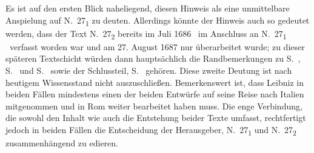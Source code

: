 Es ist auf den ersten Blick naheliegend, diesen Hinweis als eine unmittelbare Anspielung auf N.~27\textsubscript{1} zu deuten.
Allerdings könnte der Hinweis auch so gedeutet werden, dass der Text N.~27\textsubscript{2} bereits im Juli 1686 \textendash\ im Anschluss an N.~27\textsubscript{1} \textendash\ verfasst worden war und am 27. August 1687 nur überarbeitet wurde; zu dieser späteren Textschicht würden dann hauptsächlich die Randbemerkungen zu S.~, S.~ und S.~ sowie der Schlussteil, S.~ gehören.
Diese zweite Deutung ist nach heutigem Wissensstand nicht auszuschließen.
Bemerkenswert ist, dass Leibniz in beiden Fällen mindestens einen der beiden Entwürfe auf seine Reise nach Italien\protect{} mitgenommen und in Rom\protect{} weiter bearbeitet haben muss.
Die enge Verbindung, die sowohl den Inhalt wie auch die Entstehung beider Texte umfasst, rechtfertigt jedoch in beiden Fällen die Entscheidung der Herausgeber, N.~27\textsubscript{1} und N.~27\textsubscript{2} zusammenhängend zu edieren.
\pend
%
\normalsize
{}%
\frenchspacing%
%